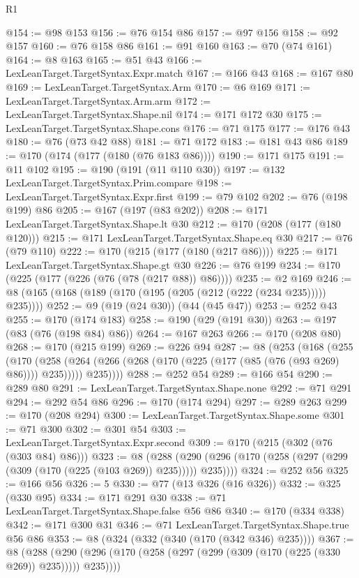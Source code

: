 \begin{lexlean}{R1}
\begin{coremodule}
{{{{{{{{{{{{{{{{{{{{@154 := @98 @153
@156 := @76 @154 @86
@157 := @97 @156
@158 := @92 @157
@160 := @76 @158 @86
@161 := @91 @160
@163 := @70 (@74 @161)
@164 := @8 @163
@165 := @51 @43
@166 := LexLeanTarget.TargetSyntax.Expr.match
@167 := @166 @43
@168 := @167 @80
@169 := LexLeanTarget.TargetSyntax.Arm
@170 := @6 @169
@171 := LexLeanTarget.TargetSyntax.Arm.arm
@172 := LexLeanTarget.TargetSyntax.Shape.nil
@174 := @171 @172 @30
@175 := LexLeanTarget.TargetSyntax.Shape.cons
@176 := @71 @175
@177 := @176 @43
@180 := @76 (@73 @42 @88)
@181 := @71 @172
@183 := @181 @43 @86
@189 := @170 (@174 (@177 (@180 (@76 @183 @86))))
@190 := @171 @175
@191 := @11 @102
@195 := @190 (@191 (@11 @110 @30))
@197 := @132 LexLeanTarget.TargetSyntax.Prim.compare
@198 := LexLeanTarget.TargetSyntax.Expr.first
@199 := @79 @102
@202 := @76 (@198 @199) @86
@205 := @167 (@197 (@83 @202))
@208 := @171 LexLeanTarget.TargetSyntax.Shape.lt @30
@212 := @170 (@208 (@177 (@180 @120)))
@215 := @171 LexLeanTarget.TargetSyntax.Shape.eq @30
@217 := @76 (@79 @110)
@222 := @170 (@215 (@177 (@180 (@217 @86))))
@225 := @171 LexLeanTarget.TargetSyntax.Shape.gt @30
@226 := @76 @199
@234 := @170 (@225 (@177 (@226 (@76 (@78 (@217 @88)) @86))))
@235 := @2 @169
@246 := @8 (@165 (@168 (@189 (@170 (@195 (@205 (@212 (@222 (@234 @235))))) @235))))
@252 := @9 (@19 (@24 @30)) (@44 (@45 @47))
@253 := @252 @43
@255 := @170 (@174 @183)
@258 := @190 (@29 (@191 @30))
@263 := @197 (@83 (@76 (@198 @84) @86))
@264 := @167 @263
@266 := @170 (@208 @80)
@268 := @170 (@215 @199)
@269 := @226 @94
@287 := @8
    (@253
      (@168
        (@255
          (@170
            (@258 (@264 (@266 (@268 (@170 (@225 (@177 (@85 (@76 (@93 @269) @86)))) @235)))))
            @235))))
@288 := @252 @54
@289 := @166 @54
@290 := @289 @80
@291 := LexLeanTarget.TargetSyntax.Shape.none
@292 := @71 @291
@294 := @292 @54 @86
@296 := @170 (@174 @294)
@297 := @289 @263
@299 := @170 (@208 @294)
@300 := LexLeanTarget.TargetSyntax.Shape.some
@301 := @71 @300
@302 := @301 @54
@303 := LexLeanTarget.TargetSyntax.Expr.second
@309 := @170 (@215 (@302 (@76 (@303 @84) @86)))
@323 := @8
    (@288 (@290 (@296 (@170 (@258 (@297 (@299 (@309 (@170 (@225 (@103 @269)) @235))))) @235))))
@324 := @252 @56
@325 := @166 @56
@326 := 5
@330 := @77 (@13 @326 (@16 @326))
@332 := @325 (@330 @95)
@334 := @171 @291 @30
@338 := @71 LexLeanTarget.TargetSyntax.Shape.false @56 @86
@340 := @170 (@334 @338)
@342 := @171 @300 @31
@346 := @71 LexLeanTarget.TargetSyntax.Shape.true @56 @86
@353 := @8 (@324 (@332 (@340 (@170 (@342 @346) @235))))
@367 := @8
    (@288 (@290 (@296 (@170 (@258 (@297 (@299 (@309 (@170 (@225 (@330 @269)) @235))))) @235))))
}}}}}}}}}}}}}}}}}}}}
\end{coremodule}
\end{lexlean}
